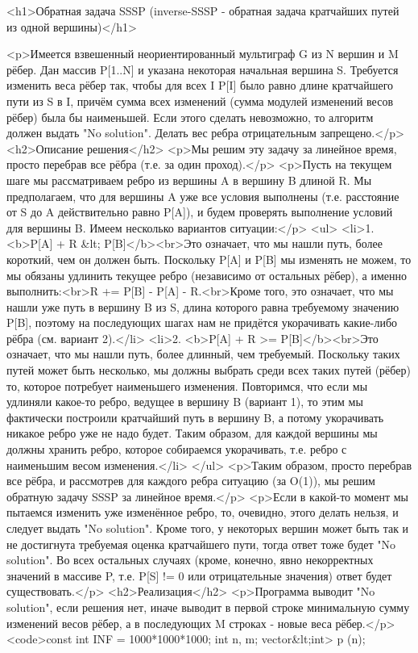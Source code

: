 <h1>Обратная задача SSSP (inverse-SSSP - обратная задача кратчайших путей из одной вершины)</h1>

<p>Имеется взвешенный неориентированный мультиграф G из N вершин и M рёбер. Дан массив P[1..N] и указана некоторая начальная вершина S. Требуется изменить веса рёбер так, чтобы для всех I P[I] было равно длине кратчайшего пути из S в I, причём сумма всех изменений (сумма модулей изменений весов рёбер) была бы наименьшей. Если этого сделать невозможно, то алгоритм должен выдать "No solution". Делать вес ребра отрицательным запрещено.</p>
<h2>Описание решения</h2>
<p>Мы решим эту задачу за линейное время, просто перебрав все рёбра (т.е. за один проход).</p>
<p>Пусть на текущем шаге мы рассматриваем ребро из вершины A в вершину B длиной R. Мы предполагаем, что для вершины A уже все условия выполнены (т.е. расстояние от S до A действительно равно P[A]), и будем проверять выполнение условий для вершины B. Имеем несколько вариантов ситуации:</p>
<ul>
<li>1. <b>P[A] + R &lt; P[B]</b><br>Это означает, что мы нашли путь, более короткий, чем он должен быть. Поскольку P[A] и P[B] мы изменять не можем, то мы обязаны удлинить текущее ребро (независимо от остальных рёбер), а именно выполнить:<br>R += P[B] - P[A] - R.<br>Кроме того, это означает, что мы нашли уже путь в вершину B из S, длина которого равна требуемому значению P[B], поэтому на последующих шагах нам не придётся укорачивать какие-либо рёбра (см. вариант 2).</li>
<li>2. <b>P[A] + R >= P[B]</b><br>Это означает, что мы нашли путь, более длинный, чем требуемый. Поскольку таких путей может быть несколько, мы должны выбрать среди всех таких путей (рёбер) то, которое потребует наименьшего изменения. Повторимся, что если мы удлиняли какое-то ребро, ведущее в вершину B (вариант 1), то этим мы фактически построили кратчайший путь в вершину B, а потому укорачивать никакое ребро уже не надо будет. Таким образом, для каждой вершины мы должны хранить ребро, которое собираемся укорачивать, т.е. ребро с наименьшим весом изменения.</li>
</ul>
<p>Таким образом, просто перебрав все рёбра, и рассмотрев для каждого ребра ситуацию (за O(1)), мы решим обратную задачу SSSP за линейное время.</p>
<p>Если в какой-то момент мы пытаемся изменить уже изменённое ребро, то, очевидно, этого делать нельзя, и следует выдать "No solution". Кроме того, у некоторых вершин может быть так и не достигнута требуемая оценка кратчайшего пути, тогда ответ тоже будет "No solution". Во всех остальных случаях (кроме, конечно, явно некорректных значений в массиве P, т.е. P[S] != 0 или отрицательные значения) ответ будет существовать.</p>
<h2>Реализация</h2>
<p>Программа выводит "No solution", если решения нет, иначе выводит в первой строке минимальную сумму изменений весов рёбер, а в последующих M строках - новые веса рёбер.</p>
<code>const int INF = 1000*1000*1000;
int n, m;
vector&lt;int> p (n);

